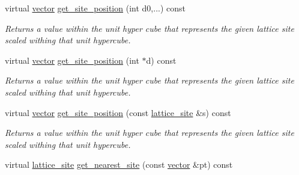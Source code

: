 \begin{DoxyCompactItemize}
\mbox{\label{classsisl_1_1cartesian__planar_a509fa024a5d4327f8b1ad81156605840}} 
virtual \hyperlink{namespacesisl_a2069bd5374a9be042ff3ce3306d41e1a}{vector} \hyperlink{classsisl_1_1cartesian__planar_a509fa024a5d4327f8b1ad81156605840}{get\+\_\+site\+\_\+position} (int d0,...) const
\begin{DoxyCompactList}\small\item\em Returns a value within the unit hyper cube that represents the given lattice site scaled withing that unit hypercube. \end{DoxyCompactList}\item 
\mbox{\label{classsisl_1_1cartesian__planar_a75f123949a7c983bded8ad94024b739e}} 
virtual \hyperlink{namespacesisl_a2069bd5374a9be042ff3ce3306d41e1a}{vector} \hyperlink{classsisl_1_1cartesian__planar_a75f123949a7c983bded8ad94024b739e}{get\+\_\+site\+\_\+position} (int $\ast$d) const
\begin{DoxyCompactList}\small\item\em Returns a value within the unit hyper cube that represents the given lattice site scaled withing that unit hypercube. \end{DoxyCompactList}\item 
\mbox{\label{classsisl_1_1cartesian__planar_afd0200d6e7828295036af9f770f9bff4}} 
virtual \hyperlink{namespacesisl_a2069bd5374a9be042ff3ce3306d41e1a}{vector} \hyperlink{classsisl_1_1cartesian__planar_afd0200d6e7828295036af9f770f9bff4}{get\+\_\+site\+\_\+position} (const \hyperlink{namespacesisl_acd18feee4026583db6185df2b25434aa}{lattice\+\_\+site} \&s) const
\begin{DoxyCompactList}\small\item\em Returns a value within the unit hyper cube that represents the given lattice site scaled withing that unit hypercube. \end{DoxyCompactList}\item 
\mbox{\label{classsisl_1_1cartesian__planar_a34e1464436af1ed48fad3c0a13251232}} 
virtual \hyperlink{namespacesisl_acd18feee4026583db6185df2b25434aa}{lattice\+\_\+site} \hyperlink{classsisl_1_1cartesian__planar_a34e1464436af1ed48fad3c0a13251232}{get\+\_\+nearest\+\_\+site} (const \hyperlink{namespacesisl_a2069bd5374a9be042ff3ce3306d41e1a}{vector} \&pt) const

\end{DoxyCompactItemize}
